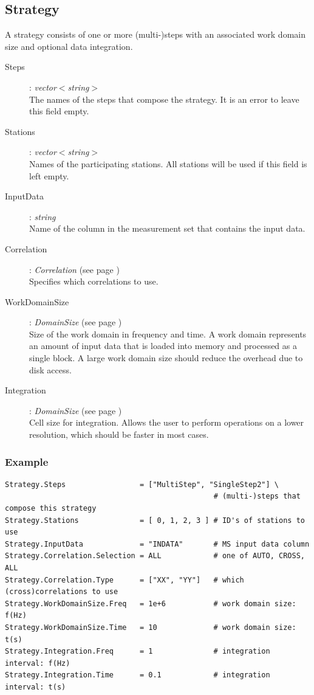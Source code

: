\documentclass[10pt]{lofar}
\begin{document}
\subsection*{Strategy}
A strategy consists of one or more (multi-)steps with an associated work domain
size and optional data integration.
\begin{description}
\item [Steps] : \emph{vector$<$string$>$} \\
    The names of the steps that compose the strategy. It is an error to leave
    this field empty.
\item [Stations] : \emph{vector$<$string$>$} \\
    Names of the participating stations. All stations will be used if this
    field is left empty.
\item [InputData] : \emph{string} \\
    Name of the column in the measurement set that contains the input data.
\item [Correlation] : \emph{Correlation} (see page \pageref{app-correlation}) \\
    Specifies which correlations to use.
\item [WorkDomainSize] : \emph{DomainSize} (see page \pageref{app-domainsize}) \\
    Size of the work domain in frequency and time. A work domain represents an
    amount of input data that is loaded into memory and processed as a single
    block.  A large work domain size should reduce the overhead due to disk
    access.
\item [Integration] : \emph{DomainSize} (see page \pageref{app-domainsize}) \\
    Cell size for integration. Allows the user to perform operations on a
    lower resolution, which should be faster in most cases.
\end{description}

\subsubsection*{Example}
{\footnotesize
\begin{verbatim}
Strategy.Steps                 = ["MultiStep", "SingleStep2"] \
                                                # (multi-)steps that compose this strategy
Strategy.Stations              = [ 0, 1, 2, 3 ] # ID's of stations to use
Strategy.InputData             = "INDATA"       # MS input data column
Strategy.Correlation.Selection = ALL            # one of AUTO, CROSS, ALL
Strategy.Correlation.Type      = ["XX", "YY"]   # which (cross)correlations to use
Strategy.WorkDomainSize.Freq   = 1e+6           # work domain size: f(Hz)
Strategy.WorkDomainSize.Time   = 10             # work domain size: t(s)
Strategy.Integration.Freq      = 1              # integration interval: f(Hz)
Strategy.Integration.Time      = 0.1            # integration interval: t(s)
\end{verbatim}
}
\end{document}
